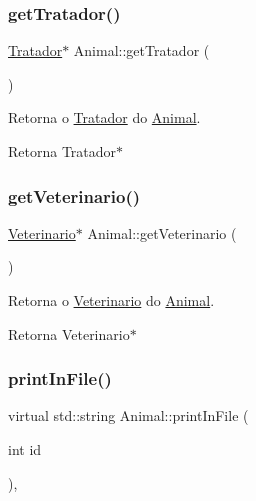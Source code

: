 \subsubsection{\texorpdfstring{get\+Tratador()}{getTratador()}}
{\footnotesize\ttfamily \hyperlink{classTratador}{Tratador}$\ast$ Animal\+::get\+Tratador (\begin{DoxyParamCaption}{ }\end{DoxyParamCaption})}



Retorna o \hyperlink{classTratador}{Tratador} do \hyperlink{classAnimal}{Animal}. 

\begin{DoxyReturn}{Retorna}
Tratador$\ast$ 
\end{DoxyReturn}
\mbox{\label{classAnimal_a9bdff52128e0ae23bbcac796b68a4d05}} 
\subsubsection{\texorpdfstring{get\+Veterinario()}{getVeterinario()}}
{\footnotesize\ttfamily \hyperlink{classVeterinario}{Veterinario}$\ast$ Animal\+::get\+Veterinario (\begin{DoxyParamCaption}{ }\end{DoxyParamCaption})}



Retorna o \hyperlink{classVeterinario}{Veterinario} do \hyperlink{classAnimal}{Animal}. 

\begin{DoxyReturn}{Retorna}
Veterinario$\ast$ 
\end{DoxyReturn}
\mbox{\label{classAnimal_ac75406040726a6339932d70164cc7242}} 
\subsubsection{\texorpdfstring{print\+In\+File()}{printInFile()}}
{\footnotesize\ttfamily virtual std\+::string Animal\+::print\+In\+File (\begin{DoxyParamCaption}\item[{int}]{id }\end{DoxyParamCaption})\hspace{0.3cm}{\ttfamily [protected]}, {}}




